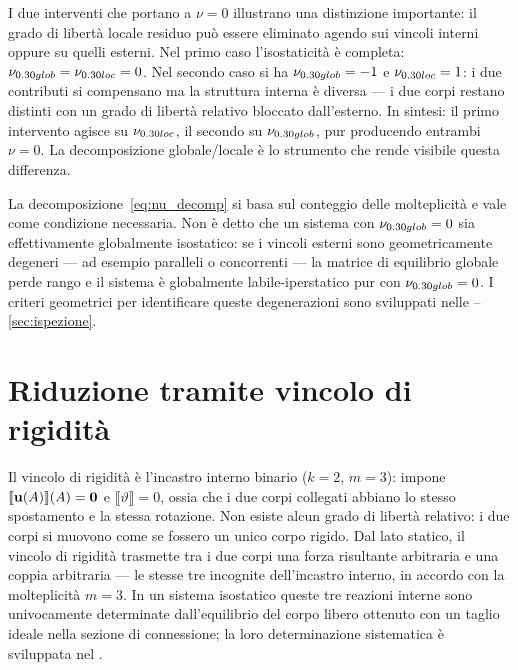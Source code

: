 \begin{esempio}
	\begin{oss}
		I due interventi che portano a $\nu = 0$
		illustrano una distinzione importante: il grado
		di libertà locale residuo può essere eliminato
		agendo sui vincoli interni oppure su quelli
		esterni. Nel primo caso l'isostaticità è
		completa: $\nu_{\rm glob} = \nu_{\rm loc} = 0$.
		Nel secondo caso si ha $\nu_{\rm glob} = -1$ e
		$\nu_{\rm loc} = 1$: i due contributi si
		compensano ma la struttura interna è diversa ---
		i due corpi restano distinti con un grado di
		libertà relativo bloccato dall'esterno.
		In sintesi: il primo intervento agisce su
		$\nu_{\rm loc}$, il secondo su $\nu_{\rm glob}$,
		pur producendo entrambi $\nu = 0$. La
		decomposizione globale/locale è lo strumento
		che rende visibile questa differenza.
	\end{oss}
\end{esempio}

\begin{oss}
	La decomposizione~\eqref{eq:nu_decomp} si basa sul
	conteggio delle molteplicità e vale come condizione
	necessaria. Non è detto che un sistema con
	$\nu_{\rm glob} = 0$ sia effettivamente globalmente
	isostatico: se i vincoli esterni sono geometricamente
	degeneri --- ad esempio paralleli o concorrenti ---
	la matrice di equilibrio globale perde rango e il
	sistema è globalmente labile-iperstatico pur con
	$\nu_{\rm glob} = 0$. I criteri geometrici per
	identificare queste degenerazioni sono sviluppati
	nelle --\ref{sec:ispezione}.
\end{oss}



\section{Riduzione tramite vincolo di rigidità}
\label{sec:rigidita_interna}

Il vincolo di rigidità è l'incastro interno binario ($k = 2$,
$m = 3$): impone $\llbracket\ub(A)\rrbracket(A) = \zerovb$ e
$\llbracket\vartheta \rrbracket= 0$, ossia che i due corpi collegati abbiano
lo stesso spostamento e la stessa rotazione.
Non esiste alcun grado di libertà relativo: i due corpi si
muovono come se fossero un unico corpo rigido.
Dal lato statico, il vincolo di rigidità trasmette tra
i due corpi una forza risultante arbitraria e una coppia
arbitraria --- le stesse tre incognite dell'incastro
interno, in accordo con la molteplicità $m = 3$.
In un sistema isostatico queste tre reazioni interne
sono univocamente determinate dall'equilibrio del corpo
libero ottenuto con un taglio ideale nella sezione
di connessione; la loro determinazione sistematica
è sviluppata nel .

